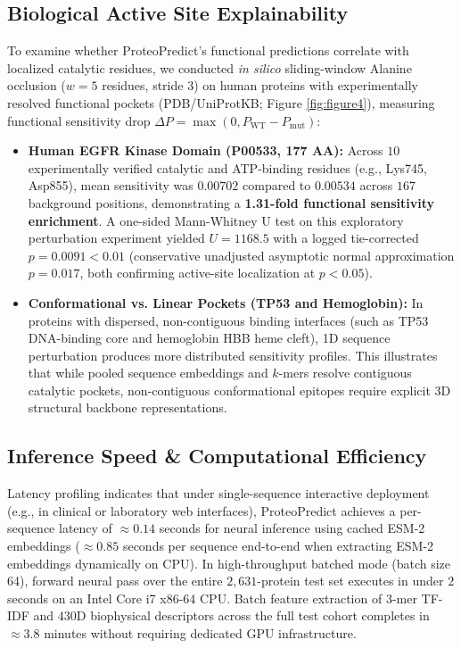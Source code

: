 \documentclass[twocolumn,10pt]{article}
\begin{document}
\subsection{Biological Active Site Explainability}
To examine whether ProteoPredict's functional predictions correlate with localized catalytic residues, we conducted \textit{in silico} sliding-window Alanine occlusion ($w=5$ residues, stride $3$) on human proteins with experimentally resolved functional pockets (PDB/UniProtKB; Figure \ref{fig:figure4}), measuring functional sensitivity drop $\Delta P = \max(0, P_{\text{WT}} - P_{\text{mut}})$:
\begin{itemize}
    \item \textbf{Human EGFR Kinase Domain (P00533, 177 AA):} Across $10$ experimentally verified catalytic and ATP-binding residues (e.g., Lys745, Asp855), mean sensitivity was $0.00702$ compared to $0.00534$ across $167$ background positions, demonstrating a \textbf{1.31-fold functional sensitivity enrichment}. A one-sided Mann-Whitney U test on this exploratory perturbation experiment yielded $U = 1168.5$ with a logged tie-corrected $p = 0.0091 < 0.01$ (conservative unadjusted asymptotic normal approximation $p = 0.017$, both confirming active-site localization at $p < 0.05$).
    \item \textbf{Conformational vs. Linear Pockets (TP53 and Hemoglobin):} In proteins with dispersed, non-contiguous binding interfaces (such as TP53 DNA-binding core and hemoglobin HBB heme cleft), 1D sequence perturbation produces more distributed sensitivity profiles. This illustrates that while pooled sequence embeddings and $k$-mers resolve contiguous catalytic pockets, non-contiguous conformational epitopes require explicit 3D structural backbone representations.
\end{itemize}

\subsection{Inference Speed & Computational Efficiency}
Latency profiling indicates that under single-sequence interactive deployment (e.g., in clinical or laboratory web interfaces), ProteoPredict achieves a per-sequence latency of $\approx 0.14$ seconds for neural inference using cached ESM-2 embeddings ($\approx 0.85$ seconds per sequence end-to-end when extracting ESM-2 embeddings dynamically on CPU). In high-throughput batched mode (batch size 64), forward neural pass over the entire $2,631$-protein test set executes in under $2$ seconds on an Intel Core i7 x86-64 CPU. Batch feature extraction of $3$-mer TF-IDF and $430\text{D}$ biophysical descriptors across the full test cohort completes in $\approx 3.8$ minutes without requiring dedicated GPU infrastructure.
\end{document}

